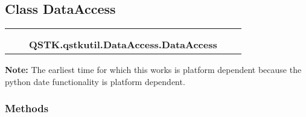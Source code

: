 

\subsection{Class DataAccess}

    \label{QSTK:qstkutil:DataAccess:DataAccess}
\begin{tabular}{cccccc}
\multicolumn{2}{r}{\settowidth{\BCL}{object}\multirow{2}{\BCL}{object}}
&&
  \\\cline{3-3}
  &&\multicolumn{1}{c|}{}
&&
  \\
&&\multicolumn{2}{l}{\textbf{QSTK.qstkutil.DataAccess.DataAccess}}
\end{tabular}

\textbf{Note:} The earliest time for which this works is platform dependent because the 
python date functionality is platform dependent.





  \subsubsection{Methods}

    \vspace{0.5ex}

